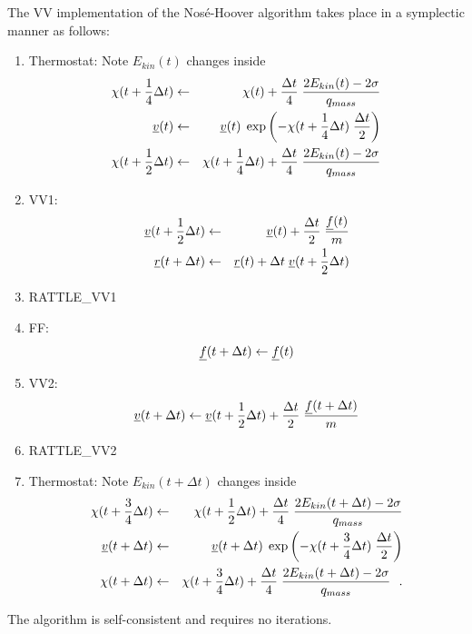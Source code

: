The VV implementation of the Nos\'e-Hoover algorithm takes place
in a symplectic manner as follows:
\begin{enumerate}
\item Thermostat: Note $E_{kin}(t)$ changes inside
\begin{eqnarray}
\chi (t + {1 \over 4} \Delta t) &\leftarrow& \chi (t) +
{\Delta t \over 4} \; {{2 E_{kin}(t) - 2 \sigma} \over q_{mass}} \nonumber \\
\mbox{$\underline{v}$}(t) &\leftarrow& \mbox{$\underline{v}$}(t) \; \exp \left(
-\chi (t + {1 \over 4} \Delta t) \; {\Delta t \over 2} \right) \\
\chi (t + {1 \over 2} \Delta t) &\leftarrow& \chi (t + {1 \over 4} \Delta t) +
{\Delta t \over 4} \; {{2 E_{kin}(t) - 2 \sigma} \over q_{mass}} \nonumber \\
\end{eqnarray}
\item VV1:
\begin{eqnarray}
\mbox{$\underline{v}$}(t + {1 \over 2} \Delta t) &\leftarrow& \mbox{$\underline{v}$}(t) +
{\Delta t \over 2} \; {\mbox{$\underline{f}$}(t) \over m} \nonumber \\
\mbox{$\underline{r}$}(t + \Delta t) &\leftarrow& \mbox{$\underline{r}$}(t) + \Delta t \;
\mbox{$\underline{v}$}(t + {1 \over 2} \Delta t)
\end{eqnarray}
\item RATTLE\_VV1
\item FF:
\begin{equation}
\mbox{$\underline{f}$}(t + \Delta t) \leftarrow \mbox{$\underline{f}$}(t)
\end{equation}
\item VV2:
\begin{equation}
\mbox{$\underline{v}$}(t + \Delta t) \leftarrow \mbox{$\underline{v}$}(t + {1 \over 2} \Delta t) +
{\Delta t \over 2} \; {\mbox{$\underline{f}$}(t + \Delta t) \over m}
\end{equation}
\item RATTLE\_VV2
\item Thermostat: Note $E_{kin}(t + \Delta t)$ changes inside
\begin{eqnarray}
\chi (t + {3 \over 4} \Delta t) &\leftarrow& \chi (t + {1 \over 2} \Delta t) +
{\Delta t \over 4} \; {{2 E_{kin}(t + \Delta t) - 2 \sigma} \over q_{mass}} \nonumber \\
\mbox{$\underline{v}$}(t + \Delta t) &\leftarrow& \mbox{$\underline{v}$}(t + \Delta t) \; \exp \left(
-\chi (t + {3 \over 4} \Delta t) \; {\Delta t \over 2} \right) \\
\chi (t + \Delta t) &\leftarrow& \chi (t + {3 \over 4} \Delta t) +
{\Delta t \over 4} \; {{2 E_{kin}(t + \Delta t) - 2 \sigma} \over q_{mass}}~~. \nonumber
\end{eqnarray}
\end{enumerate}
The algorithm is self-consistent and requires no iterations.

